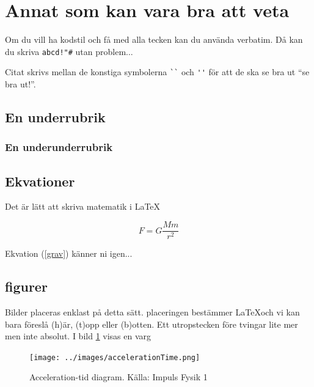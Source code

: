 \documentclass[11p]{article}
\begin{document}
 \section{Annat som kan vara bra att veta}
 Om du vill ha kodstil och få med alla tecken kan du använda verbatim. Då kan du skriva \verb|abcd!"#| utan problem...

 Citat skrivs mellan de konstiga symbolerna \verb|``| och \verb|''| för att de ska se bra ut ``se bra ut!''.
 \subsection{En underrubrik}
 \subsubsection{En underunderrubrik}
 \subsection{Ekvationer}
 Det är lätt att skriva matematik i \LaTeX


 \begin{equation}
  F = G \frac{M m}{r^2}
  \label{grav}
 \end{equation}

 Ekvation (\ref{grav}) känner ni igen...

 \subsection{figurer}
 Bilder placeras enklast på detta sätt. placeringen bestämmer \LaTeX och vi kan bara föreslå (h)är, (t)opp eller (b)otten. Ett utropstecken före tvingar lite mer men inte absolut. I bild \ref{varg} visas en varg
 \begin{figure}[!h]
  \texttt{[image: ../images/accelerationTime.png]}
  \caption{Acceleration-tid diagram. Källa: Impuls Fysik 1}
  \label{varg}
 \end{figure}
 \printbibliography
\end{document}
